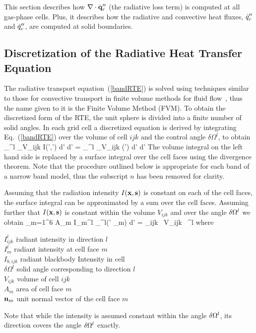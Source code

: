 \documentclass[11pt]{book}
\begin{document}
This section describes how $\nabla \cdot \dot{\bf q}_r''$ (the radiative loss term) is computed at all gas-phase cells. Plus, it describes how
the radiative and convective heat fluxes, $\dot{q}_r''$ and $\dot{q}_c''$, are computed at solid boundaries.

\subsection{Discretization of the Radiative Heat Transfer Equation}

The radiative transport equation~(\ref{bandRTE}) is solved using
techniques similar to those for convective transport in finite volume
methods for fluid flow~\cite{Raithby}, thus the name given to it is the
Finite Volume Method (FVM). To obtain the discretized form of the RTE,
the unit sphere is divided into a finite number of solid angles.
In each grid cell a discretized equation is derived by integrating
Eq.~(\ref{bandRTE}) over the volume of cell $ijk$ and the control angle
$\delta \Omega^l$, to obtain
\be
  \int_{\delta \Omega^l} \int_{V_{ijk}}
   \bs \cdot \nabla I(\bx',\bs') d\bx' d\bs' =
   \int_{\delta \Omega^l} \int_{V_{ijk}} \kappa(\bx') \;
    \left[ I_{b}(\bx') - I(\bx',\bs') \right] d\bx' d\bs'
\ee
The volume integral on the left hand side is replaced by a surface integral
over the cell faces using the divergence theorem. Note that the procedure outlined below is
appropriate for each band of a narrow band model, thus the subscript $n$ has been removed for clarity.

Assuming that the radiation intensity $I({\bf x},{\bf s})$ is constant
on each of the cell faces, the surface integral can be approximated
by a sum over the cell faces.
Assuming further that $I({\bf x},{\bf s})$ is constant within
the volume $V_{ijk}$ and over the angle $\delta {\Omega}^l$ we obtain
\be  \sum_{m=1}^6 A_m \; I_m^l \;
      \int_{\Omega^l}(\bs' \cdot \bn_m) d\bs'
   = \kappa_{ijk} \,
      \; V_{ijk} \,
     \delta \Omega^l   \label{RTEdiscrete2}
\ee
where
\begin{tabbing}
$I_{ijk}^l$ \hspace{1in}  \=  radiant intensity in direction $l$ \\
$I_m^l$                   \>  radiant intensity at cell face $m$ \\
$I_{b,ijk}$               \>  radiant blackbody Intensity in cell \\
$\delta \Omega^l$         \>  solid angle corresponding to direction $l$ \\
$V_{ijk}$                 \>  volume of cell $ijk$ \\
$A_m$                     \>  area of cell face $m$ \\
${\bf n}_m$                   \>  unit normal vector of the cell face $m$
\end{tabbing}
Note that while the intensity is assumed constant within
the angle $\delta {\Omega}^l$, its direction covers the angle $\delta {\Omega}^l$
exactly.
\end{document}
